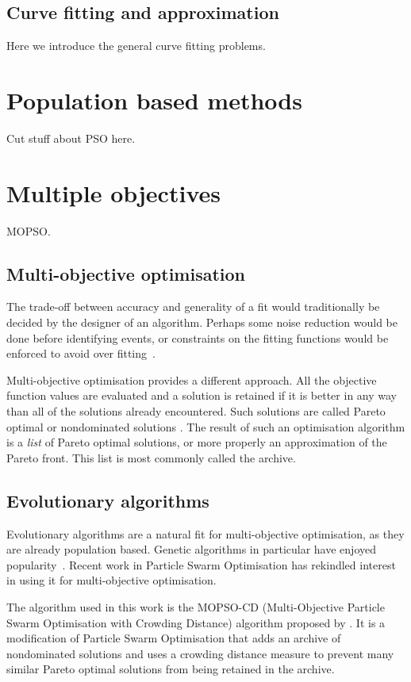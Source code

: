 \subsection{Curve fitting and approximation}
Here we introduce the general curve fitting problems.

\section{Population based methods}
Cut stuff about PSO here.

\section{Multiple objectives}
MOPSO.

\subsection{Multi-objective optimisation}
The trade-off between accuracy and generality of a fit would
traditionally be decided by the designer of an algorithm.  Perhaps
some noise reduction would be done before identifying events, or
constraints on the fitting functions would be enforced to avoid over
fitting~\cite{Arora2003Fitting,Punskaya2002Bayesian}.  

Multi-objective optimisation provides a different approach.  All the
objective function values are evaluated and a solution is retained if
it is better in any way than all of the solutions already encountered.
Such solutions are called Pareto optimal or nondominated
solutions \cite{Steuer1986Multiple}. The result of such an optimisation
algorithm is a \emph{list} of Pareto optimal solutions, or more
properly an approximation of the Pareto front.  This list is most
commonly called the archive.

\subsection{Evolutionary algorithms}
Evolutionary algorithms are a natural fit for multi-objective
optimisation, as they are already population based.  Genetic
algorithms in particular have enjoyed
popularity~\cite{Deb2001MultiObjective}.  Recent work in Particle
Swarm Optimisation has rekindled interest in using it for
multi-objective optimisation.

The algorithm used in this work is the MOPSO-CD (Multi-Objective
Particle Swarm Optimisation with Crowding Distance) algorithm proposed
by \cite{Raquel2005Effective}.  It is a modification of Particle Swarm
Optimisation that adds an archive of nondominated solutions and uses a
crowding distance measure to prevent many similar Pareto optimal
solutions from being retained in the archive.



